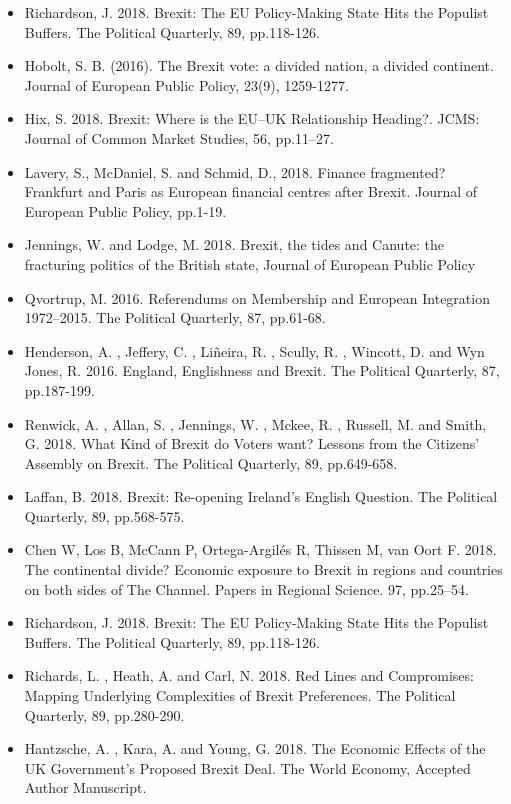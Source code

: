 \begin{itemize}
	\item Richardson, J. 2018. Brexit: The EU Policy-Making State Hits the Populist Buffers. The Political Quarterly, 89, pp.118-126.
	\item Hobolt, S. B. (2016). The Brexit vote: a divided nation, a divided continent. Journal of European Public Policy, 23(9), 1259-1277.
	\item Hix, S. 2018. Brexit: Where is the EU–UK Relationship Heading?. JCMS: Journal of Common Market Studies, 56, pp.11–27.
	\item Lavery, S., McDaniel, S. and Schmid, D., 2018. Finance fragmented? Frankfurt and Paris as European financial centres after Brexit. Journal of European Public Policy, pp.1-19.
	\item Jennings, W. and Lodge, M. 2018. Brexit, the tides and Canute: the fracturing politics of the British state, Journal of European Public Policy
	\item Qvortrup, M. 2016. Referendums on Membership and European Integration 1972–2015. The Political Quarterly, 87, pp.61-68.
	\item Henderson, A. , Jeffery, C. , Liñeira, R. , Scully, R. , Wincott, D. and Wyn Jones, R. 2016. England, Englishness and Brexit. The Political Quarterly, 87, pp.187-199.
	\item Renwick, A. , Allan, S. , Jennings, W. , Mckee, R. , Russell, M. and Smith, G. 2018. What Kind of Brexit do Voters want? Lessons from the Citizens’ Assembly on Brexit. The Political Quarterly, 89, pp.649-658.
	\item Laffan, B. 2018. Brexit: Re-opening Ireland's English Question. The Political Quarterly, 89, pp.568-575. 
	\item Chen W, Los B, McCann P, Ortega-Argilés R, Thissen M, van Oort F. 2018. The continental divide? Economic exposure to Brexit in regions and countries on both sides of The Channel. Papers in Regional Science. 97, pp.25–54.
	\item Richardson, J. 2018. Brexit: The EU Policy-Making State Hits the Populist Buffers. The Political Quarterly, 89, pp.118-126.
	\item Richards, L. , Heath, A. and Carl, N. 2018. Red Lines and Compromises: Mapping Underlying Complexities of Brexit Preferences. The Political Quarterly, 89, pp.280-290.
	\item Hantzsche, A. , Kara, A. and Young, G. 2018. The Economic Effects of the UK Government's Proposed Brexit Deal. The World Economy, Accepted Author Manuscript.

\end{itemize}
